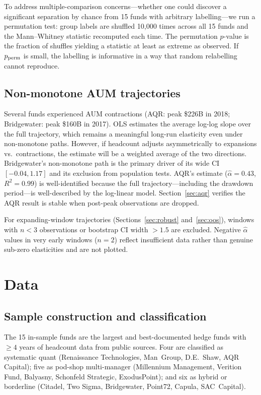 \documentclass[12pt]{article}
\newcommand{\alphahat}{\hat{\alpha}}
\begin{document}
To address multiple-comparison concerns---whether one could
discover a significant separation by chance from 15 funds with
arbitrary labelling---we run a permutation test: group labels
are shuffled 10,000 times across all 15 funds and the
Mann--Whitney statistic recomputed each time.
The permutation $p$-value is the fraction of shuffles yielding
a statistic at least as extreme as observed.
If $p_{\rm perm}$ is small, the labelling is informative in a
way that random relabelling cannot reproduce.

\subsection{Non-monotone AUM trajectories}

Several funds experienced AUM contractions (AQR: peak \$226B
in 2018; Bridgewater: peak \$160B in 2017).
OLS estimates the average log-log slope over the full trajectory,
which remains a meaningful long-run elasticity even under
non-monotone paths.
However, if headcount adjusts asymmetrically to expansions vs.\
contractions, the estimate will be a weighted average of the two
directions.
Bridgewater's non-monotone path is the primary driver of its
wide CI $[-0.04, 1.17]$ and its exclusion from population tests.
AQR's estimate ($\alphahat = 0.43$, $R^2 = 0.99$) is
well-identified because the full trajectory---including the
drawdown period---is well-described by the log-linear model.
Section~\ref{sec:aqr} verifies the AQR result is stable when
post-peak observations are dropped.

For expanding-window trajectories
(Sections~\ref{sec:robust} and~\ref{sec:oos}),
windows with $n < 3$ observations or bootstrap CI width $> 1.5$
are excluded.
Negative $\alphahat$ values in very early windows ($n = 2$)
reflect insufficient data rather than genuine sub-zero
elasticities and are not plotted.


\section{Data}
\label{sec:data}

\subsection{Sample construction and classification}

The 15 in-sample funds are the largest and best-documented hedge
funds with $\geq 4$ years of headcount data from public sources.
Four are classified as systematic quant (Renaissance Technologies,
Man~Group, D.E.~Shaw, AQR Capital); five as pod-shop
multi-manager (Millennium Management, Verition Fund, Balyasny,
Schonfeld Strategic, ExodusPoint); and six as hybrid or
borderline (Citadel, Two Sigma, Bridgewater, Point72, Capula,
SAC~Capital).
\end{document}
